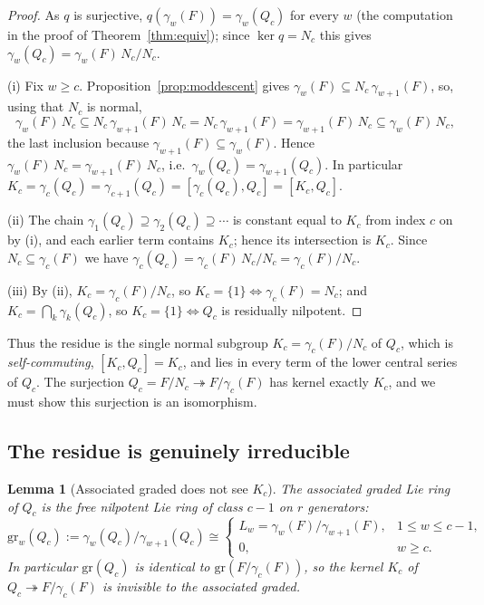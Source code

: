 \documentclass{amsart}
\newtheorem{lemma}{Lemma}
\theoremstyle{definition}
\theoremstyle{remark}
\begin{document}
\begin{proof}
As $q$ is surjective, $q(\gamma_w(F))=\gamma_w(Q_c)$ for every $w$ (the computation
in the proof of Theorem~\ref{thm:equiv}); since $\ker q=N_c$ this gives
$\gamma_w(Q_c)=\gamma_w(F)\,N_c/N_c$.

(i) Fix $w\ge c$. Proposition~\ref{prop:moddescent} gives
$\gamma_w(F)\subseteq N_c\,\gamma_{w+1}(F)$, so, using that $N_c$ is normal,
\[
\gamma_w(F)\,N_c\subseteq N_c\,\gamma_{w+1}(F)\,N_c=N_c\,\gamma_{w+1}(F)
=\gamma_{w+1}(F)\,N_c\subseteq\gamma_w(F)\,N_c,
\]
the last inclusion because $\gamma_{w+1}(F)\subseteq\gamma_w(F)$. Hence
$\gamma_w(F)\,N_c=\gamma_{w+1}(F)\,N_c$, i.e.\ $\gamma_w(Q_c)=\gamma_{w+1}(Q_c)$.
In particular $K_c=\gamma_c(Q_c)=\gamma_{c+1}(Q_c)=[\gamma_c(Q_c),Q_c]=[K_c,Q_c]$.

(ii) The chain $\gamma_1(Q_c)\supseteq\gamma_2(Q_c)\supseteq\cdots$ is constant
equal to $K_c$ from index $c$ on by (i), and each earlier term contains $K_c$;
hence its intersection is $K_c$. Since $N_c\subseteq\gamma_c(F)$ we have
$\gamma_c(Q_c)=\gamma_c(F)\,N_c/N_c=\gamma_c(F)/N_c$.

(iii) By (ii), $K_c=\gamma_c(F)/N_c$, so $K_c=\{1\}\iff\gamma_c(F)=N_c$; and
$K_c=\bigcap_k\gamma_k(Q_c)$, so $K_c=\{1\}\iff Q_c$ is residually nilpotent.
\end{proof}

\noindent
Thus the residue is the single normal subgroup $K_c=\gamma_c(F)/N_c$ of $Q_c$,
which is \emph{self-commuting}, $[K_c,Q_c]=K_c$, and lies in every term of the
lower central series of $Q_c$. The surjection $Q_c=F/N_c\twoheadrightarrow
F/\gamma_c(F)$ has kernel exactly $K_c$, and we must show this surjection is an
isomorphism.

\subsection{The residue is genuinely irreducible}

\begin{lemma}[Associated graded does not see $K_c$]\label{lem:grQ}
The associated graded Lie ring of $Q_c$ is the free nilpotent Lie ring of class
$c-1$ on $r$ generators:
\[
\mathrm{gr}_w(Q_c):=\gamma_w(Q_c)/\gamma_{w+1}(Q_c)\cong
\begin{cases} L_w=\gamma_w(F)/\gamma_{w+1}(F),& 1\le w\le c-1,\\[1mm]
0,& w\ge c.\end{cases}
\]
In particular $\mathrm{gr}(Q_c)$ is identical to $\mathrm{gr}(F/\gamma_c(F))$, so
the kernel $K_c$ of $Q_c\twoheadrightarrow F/\gamma_c(F)$ is invisible to the
associated graded.
\end{lemma}
\end{document}
